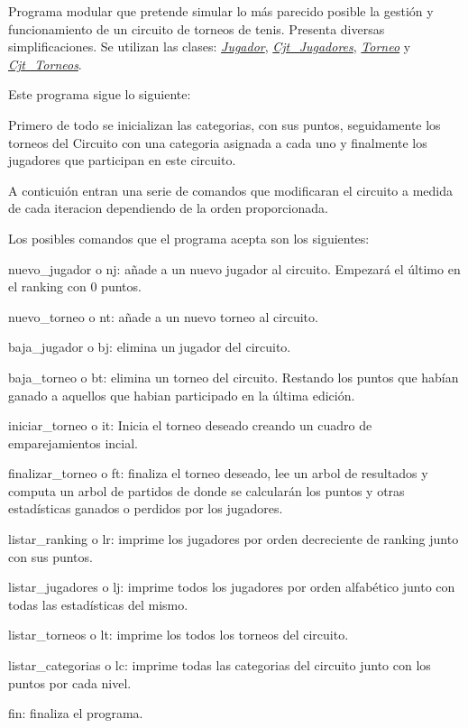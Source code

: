 Programa modular que pretende simular lo más parecido posible la gestión y funcionamiento de un circuito de torneos de tenis. Presenta diversas simplificaciones. Se utilizan las clases\+: {\itshape \mbox{\hyperlink{class_jugador}{Jugador}}}, {\itshape \mbox{\hyperlink{class_cjt___jugadores}{Cjt\+\_\+\+Jugadores}}}, {\itshape \mbox{\hyperlink{class_torneo}{Torneo}}} y {\itshape \mbox{\hyperlink{class_cjt___torneos}{Cjt\+\_\+\+Torneos}}}.

Este programa sigue lo siguiente\+:
\begin{DoxyItemize}
\item Primero de todo se inicializan las categorias, con sus puntos, seguidamente los torneos del Circuito con una categoria asignada a cada uno y finalmente los jugadores que participan en este circuito.
\item A conticuión entran una serie de comandos que modificaran el circuito a medida de cada iteracion dependiendo de la orden proporcionada.
\end{DoxyItemize}

Los posibles comandos que el programa acepta son los siguientes\+:
\begin{DoxyItemize}
\item nuevo\+\_\+jugador o nj\+: añade a un nuevo jugador al circuito. Empezará el último en el ranking con 0 puntos.
\item nuevo\+\_\+torneo o nt\+: añade a un nuevo torneo al circuito.
\item baja\+\_\+jugador o bj\+: elimina un jugador del circuito.
\item baja\+\_\+torneo o bt\+: elimina un torneo del circuito. Restando los puntos que habían ganado a aquellos que habian participado en la última edición.
\item iniciar\+\_\+torneo o it\+: Inicia el torneo deseado creando un cuadro de emparejamientos incial.
\item finalizar\+\_\+torneo o ft\+: finaliza el torneo deseado, lee un arbol de resultados y computa un arbol de partidos de donde se calcularán los puntos y otras estadísticas ganados o perdidos por los jugadores.
\item listar\+\_\+ranking o lr\+: imprime los jugadores por orden decreciente de ranking junto con sus puntos.
\item listar\+\_\+jugadores o lj\+: imprime todos los jugadores por orden alfabético junto con todas las estadísticas del mismo.
\item listar\+\_\+torneos o lt\+: imprime los todos los torneos del circuito.
\item listar\+\_\+categorias o lc\+: imprime todas las categorias del circuito junto con los puntos por cada nivel.
\item fin\+: finaliza el programa. 
\end{DoxyItemize}
